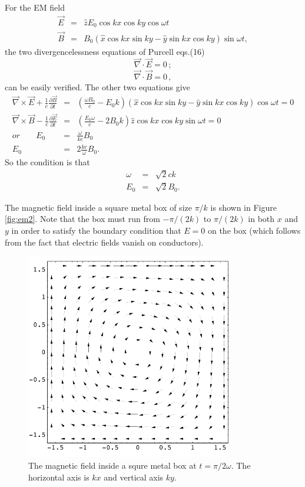 \documentclass[makesolutionspdf]{esg8022pset}
\begin{document}
\begin{solution}
For the EM field
\begin{eqnarray}
\vec{E} &=& \hat{z}E_0 \cos kx\cos ky\cos \omega t\\
\vec{B} &=&
B_0(\hat{x}\cos kx\sin ky-\hat{y}\sin kx\cos ky)\sin \omega t, 
\end{eqnarray}
the two divergencelessness equations of Purcell eqs.(16) 
\[ \vec{\nabla}\cdot\vec{E}=0 \,;\]
\[ \vec{\nabla}\cdot\vec{B}=0 \,,\]
can be easily verified.  The other two equations give
\begin{eqnarray}
\vec{\nabla}\times\vec{E}+\frac{1}{c}\frac{\partial \vec{B}}{\partial
t} &=& (\frac{\omega B_0}{c}-E_0 k)(\hat{x}\cos kx\sin ky
-\hat{y}\sin kx \cos ky)\cos \omega t =0\nonumber\\
\vec{\nabla}\times\vec{B}-\frac{1}{c}\frac{\partial \vec{E}}{\partial
t} &=& (\frac{E_0\omega}{c}-2B_0 k)\hat{z}\cos kx \cos ky \sin \omega
t =0\nonumber\\
or\;\;\;\;\;\;\; E_0 &=& \frac{\omega}{kc}B_0\\
E_0 &=& 2\frac{kc}{\omega}B_0.
\end{eqnarray}
So the condition is that 
\begin{eqnarray}
\omega &=& \sqrt{2} ck\\
E_0 &=& \sqrt{2} B_0.
\end{eqnarray}

The magnetic field inside a square metal box of size $\pi/k$ is shown
in Figure \ref{fig:em2}.  Note that the box must run from $-\pi/(2k)$ to
$\pi/(2k)$ in both $x$ and $y$ in order to satisfy the boundary
condition that $E = 0$ on the box (which follows from the fact that
electric fields vanish on conductors).

\begin{figure}[H]
    \centering
    \includegraphics[width = 9cm]{em2}
    \caption{The magnetic field inside a squre metal box at
$t=\pi/2\omega$.  The horizontal axis is $kx$ and vertical axis $ky$.}
  \end{figure}

\end{solution}
\end{document}
